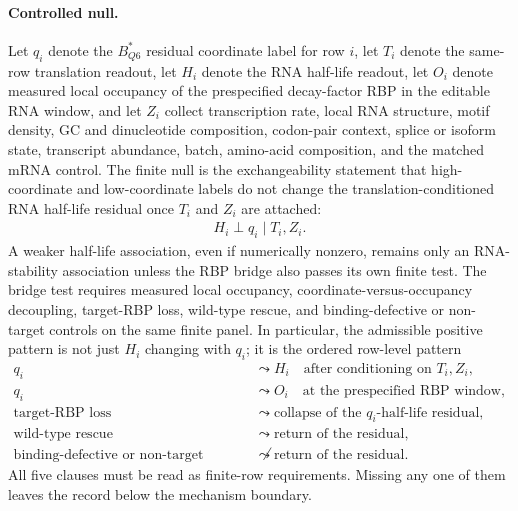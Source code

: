 \paragraph{Controlled null.}
Let $q_i$ denote the $B^*_{Q6}$ residual coordinate label for row $i$, let $T_i$ denote the same-row translation readout, let $H_i$ denote the RNA half-life readout, let $O_i$ denote measured local occupancy of the prespecified decay-factor RBP in the editable RNA window, and let $Z_i$ collect transcription rate, local RNA structure, motif density, GC and dinucleotide composition, codon-pair context, splice or isoform state, transcript abundance, batch, amino-acid composition, and the matched mRNA control. The finite null is the exchangeability statement that high-coordinate and low-coordinate labels do not change the translation-conditioned RNA half-life residual once $T_i$ and $Z_i$ are attached:
$$
\begin{aligned}
H_i \perp q_i \mid T_i,Z_i .
\end{aligned}
$$
A weaker half-life association, even if numerically nonzero, remains only an RNA-stability association unless the RBP bridge also passes its own finite test. The bridge test requires measured local occupancy, coordinate-versus-occupancy decoupling, target-RBP loss, wild-type rescue, and binding-defective or non-target controls on the same finite panel. In particular, the admissible positive pattern is not just $H_i$ changing with $q_i$; it is the ordered row-level pattern
$$
\begin{aligned}
q_i &\leadsto H_i \quad \text{after conditioning on } T_i,Z_i,\\
q_i &\leadsto O_i \quad \text{at the prespecified RBP window},\\
\text{target-RBP loss} &\leadsto \text{collapse of the } q_i\text{-half-life residual},\\
\text{wild-type rescue} &\leadsto \text{return of the residual},\\
\text{binding-defective or non-target rescue} &\not\leadsto \text{return of the residual}.
\end{aligned}
$$
All five clauses must be read as finite-row requirements. Missing any one of them leaves the record below the mechanism boundary.

